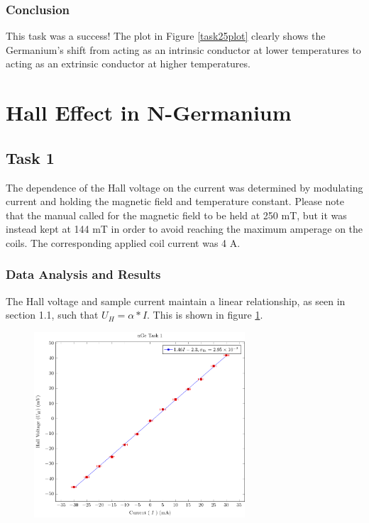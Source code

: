 \documentclass[a4paper]{article}
\begin{document}

\subsubsection{Conclusion}
\qq This task was a success! The plot in Figure \ref{task25plot} clearly shows
the Germanium's shift from acting as an intrinsic conductor at lower
temperatures to acting as an extrinsic conductor at higher temperatures.

\section{Hall Effect in N-Germanium}

\subsection{Task 1}

\qq The dependence of the Hall voltage on the current was determined 
by modulating current and holding the magnetic field and temperature 
constant. Please note that the manual called for the magnetic field to 
be held at 250 mT, but it was instead kept at 144 mT in order to 
avoid reaching the maximum amperage on the coils. The corresponding
applied coil current was 4 A.

\subsubsection{Data Analysis and Results}
\qq The Hall voltage and sample current maintain a linear
relationship, as seen in section 1.1, such that $U_H = \alpha *
I$. This is shown in figure \ref{task31plot}.

\begin{figure}[H]
\centering
\includegraphics[width=0.7\textwidth]{NGePlots/Task1/nGeTask1.pdf}
\label{task31plot}
\end{figure}
\end{document}
